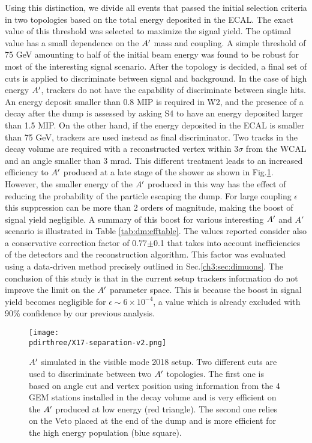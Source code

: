 Using this distinction, we divide all events that passed the initial selection criteria in two topologies based on the total energy deposited in the ECAL. The exact value of this threshold was selected to maximize the signal yield. The optimal value has a small dependence on the $\DM$ mass and coupling. A simple threshold of 75 GeV amounting to half of the initial beam energy was found to be robust for most of the interesting signal scenario. After the topology is decided, a final set of cuts is applied to discriminate between signal and background. In the case of high energy $\DM$, trackers do not have the capability of discriminate between single hits. An energy deposit smaller than 0.8 MIP is required in W2, and the presence of a decay after the dump is assessed by asking S4 to have an energy deposited larger than 1.5 MIP. On the other hand, if the energy deposited in the ECAL is smaller than 75 GeV, trackers are used instead as final discriminator. Two tracks in the decay volume are required with a reconstructed vertex within 3$\sigma$ from the WCAL and an angle smaller than 3 mrad. This different treatment leads to an increased efficiency to $\DM$ produced at a late stage of the shower as shown in Fig.\ref{fig:combined-analysis}. However, the smaller energy of the $\DM$ produced in this way has the effect of reducing the probability of the particle escaping the dump. For large coupling $\epsilon$ this suppression can be more than 2 orders of magnitude, making the boost of signal yield negligible. A summary of this boost for various interesting $\DM$ and $A'$ scenario is illustrated in Table \ref{tab:dm:efftable}. The values reported consider also a conservative correction factor of 0.77$\pm$0.1 that takes into account inefficiencies of the detectors and the reconstruction algorithm. This factor was evaluated using a data-driven method precisely outlined in Sec.\ref{ch3:sec:dimuons}. The conclusion of this study is that in the current setup trackers information do not improve the limit on the $\DM$ parameter space. This is because the boost in signal yield becomes negligible for $\epsilon \sim 6 \times 10^{-4}$, a value which is already excluded with 90\% confidence by our previous analysis.

\begin{figure}[tbh!]
  \centering
  \texttt{[image: \\pdirthree/X17-separation-v2.png]}
  \caption[Comparison of selected $\DM$ between calorimeter and tracking analysis]{$\DM$ simulated in the visible mode 2018 setup. Two different cuts are used to discriminate between two $\DM$ topologies. The first one is based on angle cut and vertex position using information from the 4 GEM stations installed in the decay volume and is very efficient on the $\DM$ produced at low energy (red triangle). The second one relies on the Veto placed at the end of the dump and is more efficient for the high energy population (blue square).}
  \label{fig:combined-analysis}
\end{figure}

